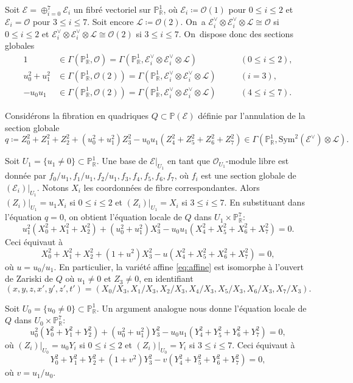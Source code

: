 \documentclass[JEP,XML,SOM,Unicode,francais,published]{cedram}
\theoremstyle{definition}
\newcommand{\R}{\mathbb R}
\renewcommand{\P}{\mathbb P}
\newcommand{\mc}[1]{\mathcal{#1}}
\begin{document}
Soit $\mc{E}=\oplus_{i=0}^7\mc{E}_i$ un fibré vectoriel sur $\P^1_\R$, où $\mc{E}_i\coloneqq \mc{O}(1)$ pour $0\leq i\leq 2$ et $\mc{E}_i=\mc{O}$ pour $3\leq i\leq 7$. Soit encore $\mc{L}\coloneqq \mc{O}(2)$. On~a $\mc{E}_i^\vee\otimes \mc{E}_i^\vee\otimes \mc{L}\cong \mc{O}$ si $0\leq i\leq 2$ et $\mc{E}_i^\vee\otimes \mc{E}_i^\vee\otimes \mc{L}\cong \mc{O}(2)$ si $3\leq i\leq 7$. On~dispose donc des sections globales
\begin{align*}
1&\in \Gamma(\P^1_\R,\mc{O})=\Gamma(\P^1_\R, \mc{E}_i^\vee\otimes \mc{E}_i^\vee\otimes \mc{L})\qquad &(0\leq i\leq 2), \\
u_0^2+u_1^2&\in \Gamma(\P^1_\R,\mc{O}(2))=\Gamma(\P^1_\R, \mc{E}_i^\vee\otimes \mc{E}_i^\vee\otimes \mc{L})\qquad &(i=3),\\
-u_0u_1& \in \Gamma(\P^1_\R,\mc{O}(2))=\Gamma(\P^1_\R, \mc{E}_i^\vee\otimes \mc{E}_i^\vee\otimes \mc{L})\qquad &(4\leq i\leq 7).
\end{align*}

Considérons la fibration en quadriques $Q \subset \P(\mc{E})$ définie par l'annulation de la section globale
\[
q \coloneqq Z_0^2 + Z_1^2 + Z_2^2 + (u_0^2+u_1^2)Z_3^2 - u_0u_1(Z_4^2 + Z_5^2 + Z_6^2 + Z_7^2)\in \Gamma(\P^1_\R,\mathrm{Sym}^2(\mc{E}^\vee) \otimes \mc{L}).
\]

Soit $U_1=\{u_1\neq 0\}\subset \P^1_\R$. Une base de $\mc{E}|_{U_1}$ en tant que $\mc{O}_{U_1}$-module libre est donnée par $f_0/u_1, f_1/u_1, f_2/u_1, f_3, f_4, f_5, f_6, f_7$, où $f_i$ est une section globale de $(\mc{E}_i)|_{U_1}$. Notons $X_i$ les coordonnées de fibre correspondantes. Alors $(Z_i)|_{U_1}=u_1X_i$ si $0\leq i\leq 2$ et $(Z_i)|_{U_1}=X_i$ si $3\leq i\leq 7$.
En substituant dans l'équation $q=0$, on obtient l'équation locale de $Q$ dans $U_1 \times \P^7_\R$:
\[
u_1^2(X_0^2+X_1^2+X_2^2) + (u_0^2+u_1^2)X_3^2 - u_0u_1(X_4^2+X_5^2+X_6^2+X_7^2) = 0.
\]
Ceci équivaut à
\begin{equation} \label{eq:local_S}
X_0^2+X_1^2+X_2^2 + (1+u^2)X_3^2 - u(X_4^2+X_5^2+X_6^2+X_7^2) = 0,
\end{equation}
où $u=u_0/u_1$. En particulier, la variété affine \eqref{eq:affine} est isomorphe à l'ouvert de Zariski de $Q$ où $u_1\neq 0$ et $Z_3\neq 0$, en identifiant
\[(x,y,z,x',y',z',t')=(X_0/X_3,X_1/X_3,X_2/X_3,X_4/X_3,X_5/X_3,X_6/X_3,X_7/X_3).\]

Soit $U_0=\{u_0\neq 0\}\subset \P^1_\R$. Un argument analogue nous donne l'équation locale de~$Q$ dans $U_0 \times \P^7_\R$:
\[
u_0^2(Y_0^2+Y_1^2+Y_2^2) + (u_0^2+u_1^2)Y_3^2 - u_0u_1(Y_4^2+Y_5^2+Y_6^2+Y_7^2) = 0,
\]
où $(Z_i)|_{U_0}=u_0Y_i$ si $0\leq i\leq 2$ et $(Z_i)|_{U_0}=Y_i$ si $3\leq i\leq 7$.
Ceci équivaut à
\begin{equation} \label{eq:local_T}
Y_0^2+Y_1^2+Y_2^2 + (1+v^2)Y_3^2 - v(Y_4^2+Y_5^2+Y_6^2+Y_7^2) = 0,
\end{equation}
où $v=u_1/u_0$.
\end{document}
